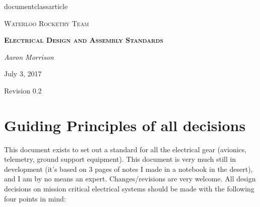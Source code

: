 documentclass{article}


\begin{titlepage}
	\centering
	{\scshape\Huge Waterloo Rocketry Team \par}
	\vspace{1.5cm}
	{\scshape\bfseries\LARGE Electrical Design and Assembly Standards\par}
	\vspace{2cm}
	{\Large\itshape Aaron Morrison\par}
	\vfill

	{\large July 3, 2017\par Revision 0.2}
    \par
\end{titlepage}

\section{Guiding Principles of all decisions}
This document exists to set out a standard for all the electrical gear (avionics, telemetry, ground support equipment). This document is very much still in development (it's based on 3 pages of notes I made in a notebook in the desert), and I am by no means an expert. Changes/revisions are very welcome. All design decisions on mission critical electrical systems should be made with the following four points in mind:

